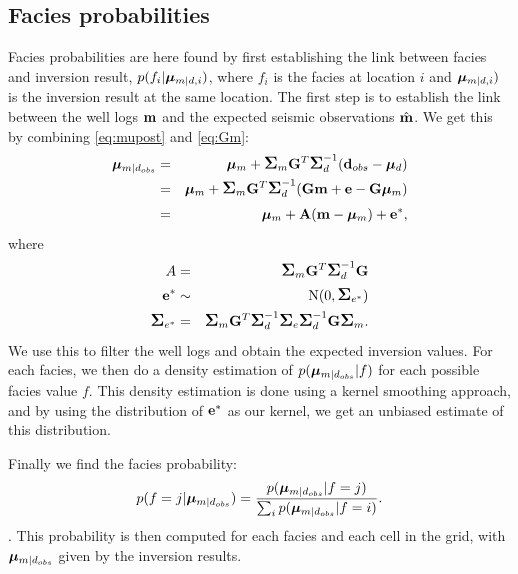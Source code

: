 \subsection{Facies probabilities}
\label{sec:facprobthe}
Facies probabilities are here found by first establishing the link between facies and inversion result, $p(f_i|\bm\mu_{m|d,i})$, where $f_i$ is the facies at location $i$ and $\bm\mu_{m|d,i})$ is the inversion result at the same location. The first step is to establish the link between the well logs $\mathbf{m}$ and the expected seismic observations $\hat{\mathbf{m}}$. We get this by combining \autoref{eq:mupost} and \autoref{eq:Gm}:
\begin{eqnarray}
\bm\mu_{m|d_{obs}} &=&\bm\mu_{m} +\mbox{\large\ensuremath{\boldsymbol{\Sigma}}}_{m}\mathbf{G}^T \mbox{\large\ensuremath{\boldsymbol{\Sigma}}}_{d}^{-1}
                           (\mathbf{d}_{obs}-\bm\mu_{d}) \nonumber \\
& = & \bm\mu_{m} +\mbox{\large\ensuremath{\boldsymbol{\Sigma}}}_{m}\mathbf{G}^T \mbox{\large\ensuremath{\boldsymbol{\Sigma}}}_{d}^{-1}
                           (\mathbf{G}\mathbf{m}+\mathbf{e}-\mathbf{G}\bm\mu_m) \nonumber\\
& = & \bm\mu_m + \mathbf{A}(\mathbf{m}-\bm\mu_m)+\mathbf{e}^*,
\end{eqnarray}
where
\begin{eqnarray}
A & = &\mbox{\large\ensuremath{\boldsymbol{\Sigma}}}_{m}\mathbf{G}^T \mbox{\large\ensuremath{\boldsymbol{\Sigma}}}_{d}^{-1}\mathbf{G} \\
\mathbf{e}^* & \sim & \text{N}(0,\mbox{\large\ensuremath{\boldsymbol{\Sigma}}}_{e^*}) \\
\mbox{\large\ensuremath{\boldsymbol{\Sigma}}}_{e^*} & = & \mbox{\large\ensuremath{\boldsymbol{\Sigma}}}_{m}\mathbf{G}^T \mbox{\large\ensuremath{\boldsymbol{\Sigma}}}_{d}^{-1}\mbox{\large\ensuremath{\boldsymbol{\Sigma}}}_e\mbox{\large\ensuremath{\boldsymbol{\Sigma}}}_{d}^{-1}\mathbf{G}\mbox{\large\ensuremath{\boldsymbol{\Sigma}}}_m.
\end{eqnarray}
We use this to filter the well logs and obtain the expected inversion values. For each facies, we then do a density estimation of $p(\bm\mu_{m|d_{obs}}|f)$ for each possible facies value $f$. This density estimation is done using a kernel smoothing approach, and by using the distribution of $\mathbf{e}^*$ as our kernel, we get an unbiased estimate of this distribution.

Finally we find the facies probability:
\begin{equation}
p(f=j|\bm\mu_{m|d_{obs}}) = \frac{p(\bm\mu_{m|d_{obs}}|f=j)}{\sum_i p(\bm\mu_{m|d_{obs}}|f=i)}.
\end{equation}.
This probability is then computed for each facies and each cell in the grid, with $\bm\mu_{m|d_{obs}}$ given by the inversion results. 